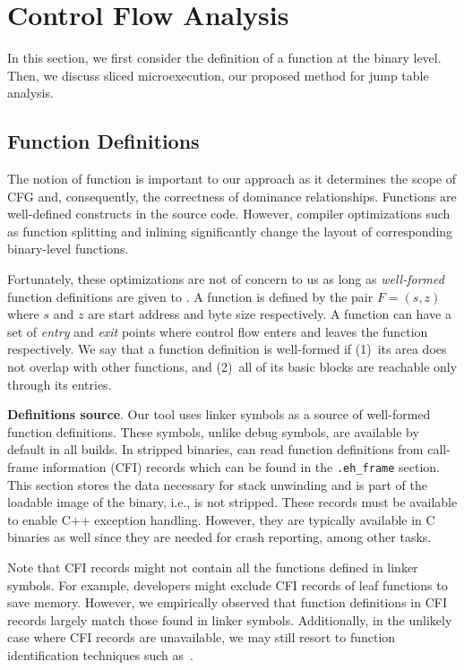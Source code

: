 
\section{Control Flow Analysis}
\label{sec:controlflow}
In this section, we first consider the definition of a function at the binary level.
Then, we discuss sliced microexecution, our proposed method for jump table analysis.
\subsection{Function Definitions}
\label{sec:function-definitions}

The notion of function is important to our approach as it determines the scope of CFG and, consequently, the correctness of dominance relationships.
Functions are well-defined constructs in the source code.
However, compiler optimizations such as function splitting and inlining significantly change the layout of corresponding binary-level functions.

Fortunately, these optimizations are not of concern to us as long as \textit{well-formed} function definitions are given to {\bcov}.
A function is defined by the pair $F=(s,z)$ where $s$ and $z$ are start address and byte size respectively.
A function can have a set of \textit{entry} and \textit{exit} points where control flow enters and leaves the function respectively.
We say that a function definition is well-formed if
(1)~its area does not overlap with other functions, and
(2)~all of its basic blocks are reachable only through its entries.

\textbf{Definitions source}.
Our tool uses linker symbols as a source of well-formed function definitions.
These symbols, unlike debug symbols, are available by default in all builds.
In stripped binaries, {\bcov} can read function definitions from call-frame information (CFI) records which can be found in the \texttt{.eh\_frame} section.
This section stores the data necessary for stack unwinding and is part of the loadable image of the binary, i.e., is not stripped.
These records must be available to enable C++ exception handling.
However, they are typically available in C binaries as well since they
are needed for crash reporting, among other tasks.

Note that CFI records might not contain all the functions defined in linker symbols.
For example, developers might exclude CFI records of leaf functions to save memory.
However, we empirically observed that function definitions in CFI records largely match those found in linker symbols.
Additionally, in the unlikely case where CFI records are unavailable,
we may still resort to function identification techniques such as~\cite{Andriesse2017,BYTEWEIGHT2014Bao}.


